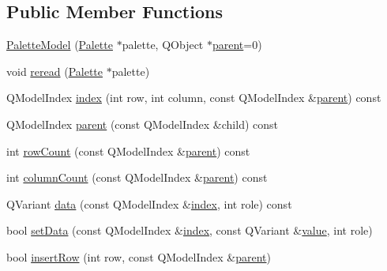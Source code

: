 \subsection*{Public Member Functions}
\begin{DoxyCompactItemize}
\item 
\mbox{\hyperlink{class_palette_model_a7ddfc1d43aab3f5112fc5faa1b1b5f5b}{Palette\+Model}} (\mbox{\hyperlink{class_palette}{Palette}} $\ast$palette, Q\+Object $\ast$\mbox{\hyperlink{class_palette_model_aec318277f3470bebefbc5c54329c2bf0}{parent}}=0)
\item 
void \mbox{\hyperlink{class_palette_model_a349a1cb79eb3675e40a8ccbe3f801d01}{reread}} (\mbox{\hyperlink{class_palette}{Palette}} $\ast$palette)
\item 
Q\+Model\+Index \mbox{\hyperlink{class_palette_model_a193464f0511b7d81c936162dbc613282}{index}} (int row, int column, const Q\+Model\+Index \&\mbox{\hyperlink{class_palette_model_aec318277f3470bebefbc5c54329c2bf0}{parent}}) const
\item 
Q\+Model\+Index \mbox{\hyperlink{class_palette_model_aec318277f3470bebefbc5c54329c2bf0}{parent}} (const Q\+Model\+Index \&child) const
\item 
int \mbox{\hyperlink{class_palette_model_a4e78b9a576e8d7de8bb7a9e5b7c9eded}{row\+Count}} (const Q\+Model\+Index \&\mbox{\hyperlink{class_palette_model_aec318277f3470bebefbc5c54329c2bf0}{parent}}) const
\item 
int \mbox{\hyperlink{class_palette_model_a799e20927106996c71844ed5ea78732f}{column\+Count}} (const Q\+Model\+Index \&\mbox{\hyperlink{class_palette_model_aec318277f3470bebefbc5c54329c2bf0}{parent}}) const
\item 
Q\+Variant \mbox{\hyperlink{class_palette_model_a44d61df1c8db82dacb531cbc58072759}{data}} (const Q\+Model\+Index \&\mbox{\hyperlink{class_palette_model_a193464f0511b7d81c936162dbc613282}{index}}, int role) const
\item 
bool \mbox{\hyperlink{class_palette_model_aff3615f74814639acb99780a1a115993}{set\+Data}} (const Q\+Model\+Index \&\mbox{\hyperlink{class_palette_model_a193464f0511b7d81c936162dbc613282}{index}}, const Q\+Variant \&\mbox{\hyperlink{diffusion_8cpp_a4b41795815d9f3d03abfc739e666d5da}{value}}, int role)
\item 
bool \mbox{\hyperlink{class_palette_model_af2fa88e25954f25d8bdf54925f707c7c}{insert\+Row}} (int row, const Q\+Model\+Index \&\mbox{\hyperlink{class_palette_model_aec318277f3470bebefbc5c54329c2bf0}{parent}})
\item 

\end{DoxyCompactItemize}
